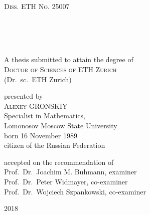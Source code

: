\begin{titlepage}
    \begin{center}
        \large
        \begingroup
            \textsc{Diss. ETH No. 25007}
        \endgroup


        \vfill

        \begingroup
            \\
            \\
            \\
        \endgroup

        \vfill

        \begingroup
            A thesis submitted to attain the degree of \\
            \textsc{Doctor of Sciences of ETH Zurich} \\
            (Dr.\ sc.\ ETH Zurich)
        \endgroup

        \vfill

        \begingroup
            presented by\\
            \vspace{0.5em}
            \textsc{Alexey GRONSKIY}\\
            Specialist in Mathematics, \\
            Lomonosov Moscow State University \\
            \vspace{0.5em}
            born 16 November 1989\\
            citizen of the Russian Federation
        \endgroup

        \vfill

        \begingroup
            accepted on the recommendation of\\
            \vspace{0.5em}
            Prof.\ Dr.\ Joachim M. Buhmann, examiner\\
            Prof.\ Dr.\ Peter Widmayer, co-examiner\\
            Prof.\ Dr.\ Wojciech Szpankowski, co-examiner
        \endgroup

        \vfill

        2018%

        \vfill
    \end{center}
\end{titlepage}